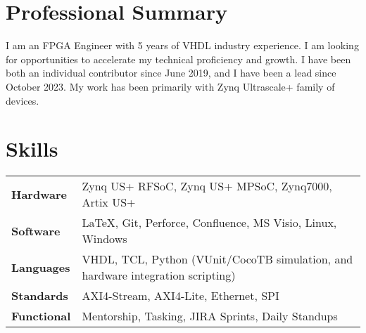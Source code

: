 \documentclass[10pt,final,sans]{resume}
\begin{document}
\setlength\headheight{28pt} %

\section{Professional Summary}
\raggedright{I am an FPGA Engineer with 5 years of VHDL industry experience. I am looking for opportunities to accelerate my technical proficiency and growth. I have been both an individual contributor since June 2019, and I have been a lead since October 2023. My work has been primarily with Zynq Ultrascale+ family of devices.}

\section{Skills}
\begin{tabular}{ l l }
  \textbf{Hardware}   & Zynq US+ RFSoC, Zynq US+ MPSoC, Zynq7000, Artix US+ \\
  \textbf{Software}   & {\textrm \LaTeX}, Git, Perforce, Confluence, MS Visio, Linux, Windows \\
  \textbf{Languages}  & VHDL, TCL, Python (VUnit/CocoTB simulation, and hardware integration scripting) \\
  \textbf{Standards}  & AXI4-Stream, AXI4-Lite, Ethernet, SPI  \\
  \textbf{Functional} & Mentorship, Tasking, JIRA Sprints, Daily Standups \\
 \end{tabular}
\end{document}
